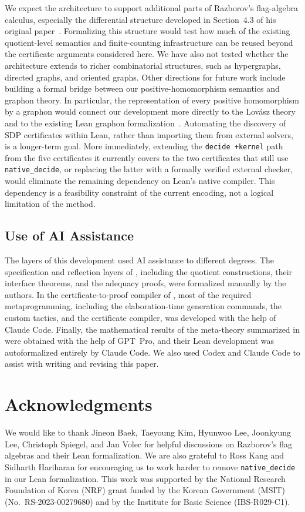 \documentclass{article}
\newcommand{\lean}[1]{\texttt{#1}}
\begin{document}
We expect the architecture to support additional parts of Razborov's
flag-algebra calculus, especially the differential structure developed in
Section~4.3 of his original paper~\cite{razborov2007flag}.  Formalizing this
structure would test how much of the existing quotient-level semantics and
finite-counting infrastructure can be reused beyond the certificate arguments
considered here.  We have also not tested whether the architecture extends to
richer combinatorial structures, such as hypergraphs, directed graphs, and
oriented graphs.  Other directions for future work include building a formal
bridge between our positive-homomorphism semantics and graphon theory.  In
particular, the representation of every positive homomorphism by a
graphon would connect our development more directly to the Lov\'asz
theory~\cite{lovasz2012large} and to the existing Lean graphon
formalization~\cite{freer2026graphon}.  Automating the discovery of SDP
certificates within Lean, rather than importing them from external solvers, is
a longer-term goal.  More immediately, extending the \lean{decide +kernel}
path from the five certificates it currently covers to the two certificates
that still use \lean{native\_decide}, or replacing the latter with a formally
verified external checker, would eliminate the remaining dependency on Lean's
native compiler.  This dependency is a feasibility constraint of the current
encoding, not a logical limitation of the method.

\subsection*{Use of AI Assistance}
The layers of this development used AI assistance to different degrees.  The
specification and reflection layers of ,
including the quotient constructions, their interface theorems, and the
adequacy proofs, were formalized manually by the authors.  In the
certificate-to-proof compiler of , most of the required
metaprogramming, including the elaboration-time generation commands, the custom
tactics, and the certificate compiler, was developed with the help of
Claude Code.  Finally, the mathematical results of the meta-theory
summarized in  were obtained with the help of GPT~Pro,
and their Lean development was autoformalized entirely by Claude Code.  We
also used Codex and Claude Code to assist with writing and revising this paper.

\section*{Acknowledgments}
We would like to thank Jineon Baek, Taeyoung Kim, Hyunwoo Lee, Joonkyung Lee, Christoph Spiegel, 
and Jan Volec for helpful discussions on Razborov's flag algebras and their Lean formalization.  
We are also grateful to
Ross Kang and Sidharth Hariharan for encouraging us to work harder to remove
\lean{native\_decide} in our Lean formalization.
This work was supported by the National Research Foundation of Korea (NRF)
grant funded by the Korean Government (MSIT) (No.~RS-2023-00279680) and by the
Institute for Basic Science (IBS-R029-C1).
\end{document}

